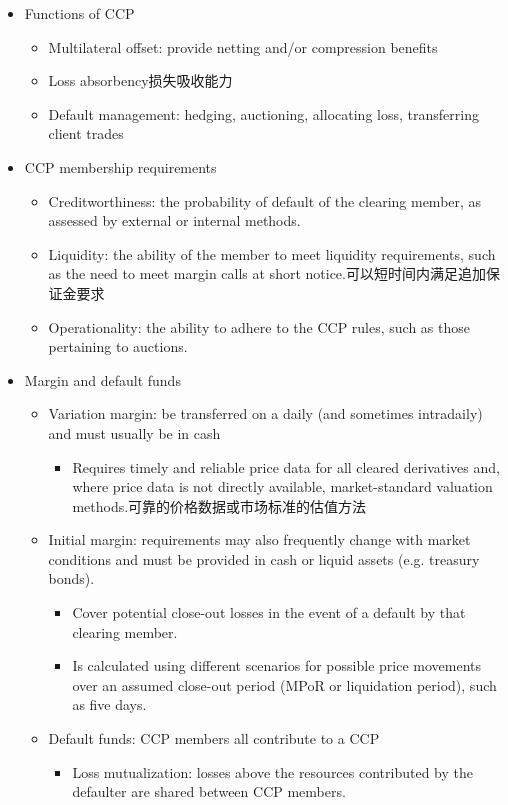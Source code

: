 \begin{itemize}
    \item Functions of CCP
    \begin{itemize}
        \item Multilateral offset: provide netting and/or compression benefits
        \item Loss absorbency损失吸收能力
        \item Default management: hedging, auctioning, allocating loss, transferring client trades
    \end{itemize}
\item CCP membership requirements
\begin{itemize}
    \item Creditworthiness: the probability of default of the clearing member, as assessed by external or internal methods.
    \item Liquidity: the ability of the member to meet liquidity requirements, such as the need to meet margin calls at short notice.可以短时间内满足追加保证金要求
    \item Operationality: the ability to adhere to the CCP rules, such as those pertaining to auctions.
\end{itemize}
\item Margin and default funds
\begin{itemize}
    \item Variation margin: be transferred on a daily (and sometimes intradaily) and must usually be in cash
    \begin{itemize}
    \item Requires timely and reliable price data for all cleared derivatives and, where price data is not directly available, market-standard valuation methods.可靠的价格数据或市场标准的估值方法
    \end{itemize}
\item Initial margin: requirements may also frequently change with market conditions and must be provided in cash or liquid
    assets (e.g. treasury bonds).
    \begin{itemize}
    \item Cover potential close-out losses in the event of a default by that clearing member.
    \item Is calculated using different scenarios for possible price movements over an assumed close-out period (MPoR or liquidation period), such as five days.
    \end{itemize}

\item Default funds: CCP members all contribute to a CCP
    \begin{itemize}
    \item Loss mutualization: losses above the resources contributed by the defaulter are shared between CCP members.
    \end{itemize}
 

\end{itemize}
\end{itemize}
